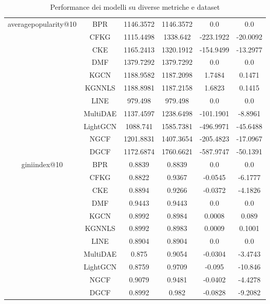\begin{table}[H]
{\begin{tabular}{|c|c|c|c|c|c|}
            \multirow{11}{*}{averagepopularity@10} 
                & BPR & 1146.3572 & 1146.3572 & 0.0 & 0.0 \\ \cline{2-6} 
                & CFKG & 1115.4498 & 1338.642 & -223.1922 & -20.0092 \\ \cline{2-6} 
                & CKE & 1165.2413 & 1320.1912 & -154.9499 & -13.2977 \\ \cline{2-6} 
                & DMF & 1379.7292 & 1379.7292 & 0.0 & 0.0 \\ \cline{2-6} 
                & KGCN & 1188.9582 & 1187.2098 & 1.7484 & 0.1471 \\ \cline{2-6} 
                & KGNNLS & 1188.8981 & 1187.2158 & 1.6823 & 0.1415 \\ \cline{2-6} 
                & LINE & 979.498 & 979.498 & 0.0 & 0.0 \\ \cline{2-6} 
                & MultiDAE & 1137.4597 & 1238.6498 & -101.1901 & -8.8961 \\ \cline{2-6} 
                & LightGCN & 1088.741 & 1585.7381 & -496.9971 & -45.6488 \\ \cline{2-6} 
                & NGCF & 1201.8831 & 1407.3654 & -205.4823 & -17.0967 \\ \cline{2-6} 
                & DGCF & 1172.6874 & 1760.6621 & -587.9747 & -50.1391 \\ \hline

            \multirow{11}{*}{giniindex@10} 
                & BPR & 0.8839 & 0.8839 & 0.0 & 0.0 \\ \cline{2-6} 
                & CFKG & 0.8822 & 0.9367 & -0.0545 & -6.1777 \\ \cline{2-6} 
                & CKE & 0.8894 & 0.9266 & -0.0372 & -4.1826 \\ \cline{2-6} 
                & DMF & 0.9443 & 0.9443 & 0.0 & 0.0 \\ \cline{2-6} 
                & KGCN & 0.8992 & 0.8984 & 0.0008 & 0.089 \\ \cline{2-6} 
                & KGNNLS & 0.8992 & 0.8983 & 0.0009 & 0.1001 \\ \cline{2-6} 
                & LINE & 0.8904 & 0.8904 & 0.0 & 0.0 \\ \cline{2-6} 
                & MultiDAE & 0.875 & 0.9054 & -0.0304 & -3.4743 \\ \cline{2-6} 
                & LightGCN & 0.8759 & 0.9709 & -0.095 & -10.846 \\ \cline{2-6} 
                & NGCF & 0.9079 & 0.9481 & -0.0402 & -4.4278 \\ \cline{2-6} 
                & DGCF & 0.8992 & 0.982 & -0.0828 & -9.2082 \\ \hline
        \end{tabular}
    }
    \caption{Performance dei modelli su diverse metriche e dataset}
\end{table}



